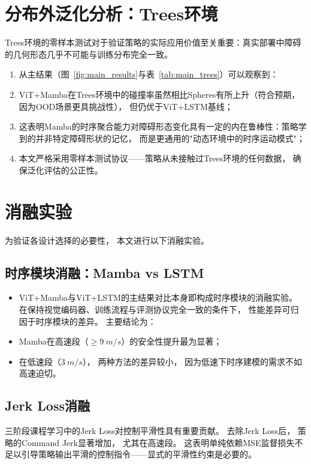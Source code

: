 \section{分布外泛化分析：Trees环境}

Trees环境的零样本测试对于验证策略的实际应用价值至关重要：真实部署中障碍的几何形态几乎不可能与训练分布完全一致。

\begin{enumerate}
\item 从主结果（图~\ref{fig:main_results}与表~\ref{tab:main_trees}）可以观察到：
\item ViT+Mamba在Trees环境中的碰撞率虽然相比Spheres有所上升（符合预期，
因为OOD场景更具挑战性），
但仍优于ViT+LSTM基线；
 \item 这表明Mamba的时序聚合能力对障碍形态变化具有一定的内在鲁棒性：策略学到的并非特定障碍形状的记忆，
而是更通用的"动态环境中的时序运动模式"；
 \item 本文严格采用零样本测试协议——策略从未接触过Trees环境的任何数据，
确保泛化评估的公正性。
 \end{enumerate}


\section{消融实验}

为验证各设计选择的必要性，
本文进行以下消融实验。

\subsection{时序模块消融：Mamba vs LSTM}

\begin{itemize}
\item ViT+Mamba与ViT+LSTM的主结果对比本身即构成时序模块的消融实验。
在保持视觉编码器、训练流程与评测协议完全一致的条件下，
性能差异可归因于时序模块的差异。
主要结论为：
\item Mamba在高速段（$\geq \SI{9}{m/s}$）的安全性提升最为显著；
 \item 在低速段（$\SI{3}{m/s}$），
两种方法的差异较小，
因为低速下时序建模的需求不如高速迫切。
 \end{itemize}

\subsection{Jerk Loss消融}

三阶段课程学习中的Jerk Loss对控制平滑性具有重要贡献。
去除Jerk Loss后，
策略的Command Jerk显著增加，
尤其在高速段。
这表明单纯依赖MSE监督损失不足以引导策略输出平滑的控制指令——显式的平滑性约束是必要的。

